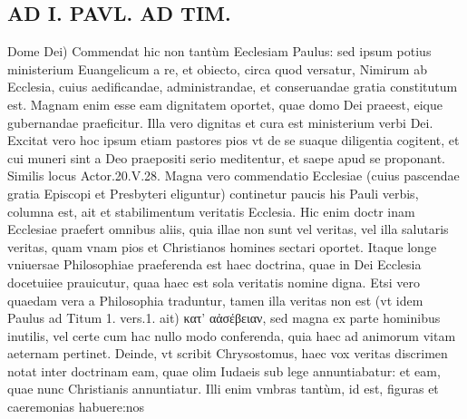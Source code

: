 \documentclass{article}
\begin{document}
\begin{pages}
\section*{AD I. PAVL. AD TIM. }
\marginpar{[ p.114 ]}\pstart Dome Dei) Commendat hic non tantùm Eeclesiam Paulus: sed ipsum potius ministerium Euangelicum a re, et obiecto, circa quod versatur, Nimirum ab Ecclesia, cuius aedificandae, administrandae, et conseruandae gratia constitutum est. Magnam enim esse eam dignitatem oportet, quae domo Dei praeest, eique gubernandae praeficitur. Illa vero dignitas et cura est ministerium verbi Dei. Excitat vero hoc ipsum etiam pastores pios vt de se suaque diligentia cogitent, et cui muneri sint a Deo praepositi serio meditentur, et saepe apud se proponant. Similis locus Actor.20.V.28. Magna vero commendatio Ecclesiae (cuius pascendae gratia Episcopi et Presbyteri eliguntur) continetur paucis his Pauli verbis, columna est, ait et stabilimentum veritatis Ecclesia. Hic enim doctr inam Ecclesiae praefert omnibus aliis, quia illae non sunt vel veritas, vel illa salutaris veritas, quam vnam pios et Christianos homines sectari oportet. Itaque longe vniuersae Philosophiae praeferenda est haec doctrina, quae in Dei Ecclesia docetuiiee prauicutur, quaa haec est sola veritatis nomine digna. Etsi vero quaedam vera a Philosophia traduntur, tamen illa veritas non est (vt idem Paulus ad Titum 1. vers.1. ait) κατ' αἀσέβειαν, sed magna ex parte hominibus inutilis, vel certe cum hac nullo modo conferenda, quia haec ad animorum vitam aeternam pertinet. Deinde, vt scribit Chrysostomus, haec vox ve\pend\pstart ritas discrimen notat inter doctrinam eam, quae olim Iudaeis sub lege annuntiabatur: et eam, quae nunc Christianis annuntiatur. Illi enim vmbras tantùm, id est, figuras et caeremonias habuere:nos  \pend

\end{pages}
\end{document}
